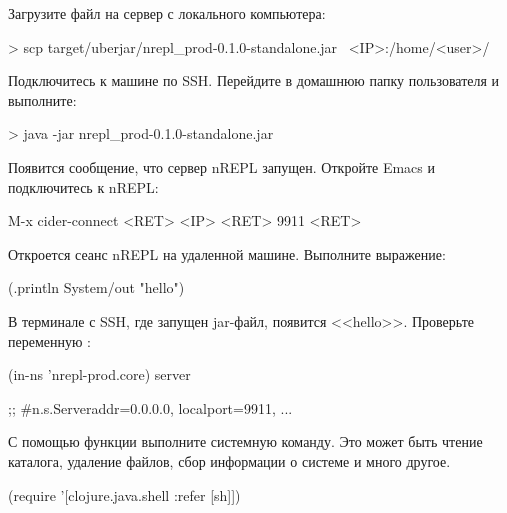 Загрузите файл на сервер с локального компьютера:

\begin{english}
  \begin{bash}
> scp target/uberjar/nrepl_prod-0.1.0-standalone.jar \
      <IP>:/home/<user>/
  \end{bash}
\end{english}

Подключитесь к машине по SSH. Перейдите в домашнюю папку пользователя и выполните:

\begin{english}
  \begin{bash}
> java -jar nrepl_prod-0.1.0-standalone.jar
  \end{bash}
\end{english}

Появится сообщение, что сервер nREPL запущен. Откройте Emacs и подключитесь к nREPL:

\begin{english}
  \begin{text}
M-x cider-connect <RET> <IP> <RET> 9911 <RET>
  \end{text}
\end{english}

Откроется сеанс nREPL на удаленной машине. Выполните выражение:

\begin{english}
  \begin{clojure}
(.println System/out "hello")
  \end{clojure}
\end{english}

В терминале с SSH, где запущен jar-файл, появится <<hello>>. Проверьте переменную :

\begin{english}
  \begin{clojure}
(in-ns 'nrepl-prod.core)
server

;; #n.s.Server{addr=0.0.0.0, localport=9911, ...}
  \end{clojure}
\end{english}


С помощью функции  выполните системную команду. Это может быть чтение каталога, удаление файлов, сбор информации о системе и много другое.

\begin{english}
  \begin{clojure}
(require '[clojure.java.shell :refer [sh]])
  \end{clojure}
\end{english}

